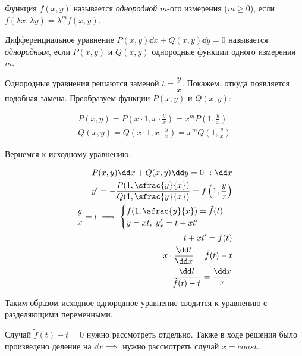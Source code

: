 
\begin{definition}
  Функция \(f(x, y)\) называется \textit{однородной} \(m\)-ого измерения
  (\(m \ge 0\)), если \(f(\lambda x, \lambda y) = \lambda^{m} f(x, y)\).
\end{definition}

\begin{definition}
  Дифференциальное уравнение \(P(x, y) \dd x + Q(x, y) \dd y = 0\) называется
  \textit{однородным}, если \(P(x, y)\) и \(Q(x, y)\) однородные функции 
  одного измерения \(m\).
\end{definition}

Однородные уравнения решаются заменой \(t = \dfrac{y}{x}\). Покажем, откуда
появляется подобная замена. Преобразуем функции \(P(x, y)\) и \(Q(x, y)\):

\begin{align*}
  P(x, y) = P \left( x \cdot 1, x \cdot \frac{y}{x} \right)
    = x^{m} P \left( 1, \frac{y}{x} \right) \\
  Q(x, y) = Q \left( x \cdot 1, x \cdot \frac{y}{x} \right)
    = x^{m} Q \left( 1, \frac{y}{x} \right)
\end{align*}

Вернемся к исходному уравнению:

\begin{align*}
  P(x, y) \dd x + Q(x, y) \dd y = 0 \mid \colon \dd x \\
  y'
  = -\frac{P(1, \sfrac{y}{x})}{Q(1, \sfrac{y}{x})}
  = f \left( 1, \frac{y}{x} \right) \\
  \frac{y}{x} = t \implies \begin{cases}
    f(1, \sfrac{y}{x}) = \tilde{f}(t) \\
    y = xt, \; y'_{x} = t + x t'
  \end{cases} \\
  t + x t' = \tilde{f}(t) \\
  x \cdot \frac{\dd t}{\dd x} = \tilde{f}(t) - t \\
  \frac{\dd t}{\tilde{f}(t) - t} = \frac{\dd x}{x}
\end{align*}

Таким образом исходное однородное уравнение сводится к уравнению с разделяющими
переменными.

\begin{remark}
  Случай \(\tilde{f}(t) - t = 0\) нужно рассмотреть отдельно. Также в ходе
  решения было произведено деление на \(\dd x \implies\) нужно рассмотреть
  случай \(x = const\).
\end{remark}
